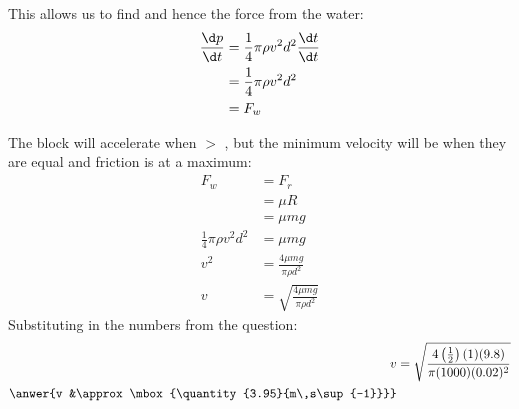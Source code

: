 \begin{problem}
{This allows us to find  and hence the force from the water:
\begin{align*} 
\frac{\d p}{\d t} &= \frac{1}{4}\pi\rho v^{2} d^{2} \frac{\d t}{\d t} \\ 
&= \frac{1}{4}\pi\rho v^{2} d^{2} \\ 
&= F_{w}
 \end{align*}

The block will accelerate when  $>$ , but the minimum velocity will be when they are equal and friction is at a maximum:
\begin{align*} 
F_{w} &= F_{r} \\ &= \mu R \\ 
&= \mu mg \\
 \frac{1}{4}\pi\rho v^{2} d^{2} &= \mu mg \\
  v^{2} &= \frac{4\mu mg}{\pi\rho d^{2}} \\ 
  v &= \sqrt{\frac{4\mu mg}{\pi\rho d^{2}}}
  \end{align*}
Substituting in the numbers from the question:
\begin{align*}
 v &= \sqrt{\frac{4\left(\frac{1}{2}\right)(1)(9.8)}{\pi(1000)(0.02)^{2}}}  \\ 
 \anwer{v &\approx \mbox{\quantity{3.95}{m\,s\sup{-1}}}}
  \end{align*}
}
\end{problem}